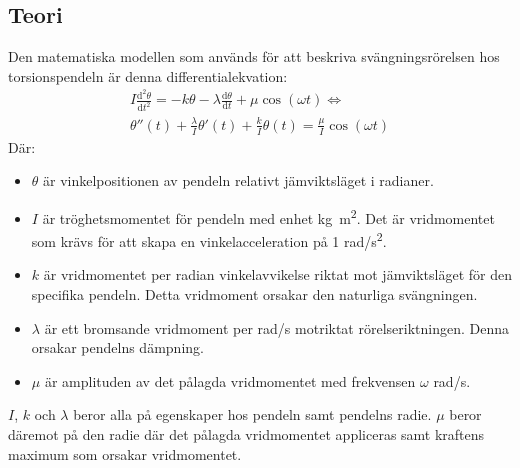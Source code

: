 \documentclass[12pt, a4paper]{article}
\begin{document}
\subsection{Teori}
Den matematiska modellen som används för att beskriva svängningsrörelsen hos torsionspendeln är denna differentialekvation:
\begin{equation*}
	\begin{split}
		I\frac{\mathrm{d}^2\theta}{\mathrm{d}t^2}=-k\theta-\lambda\frac{\mathrm{d}\theta}{\mathrm{d}t}+\mu\cos(\omega t)\Leftrightarrow\\
		\theta''(t)+\frac{\lambda}{I}\theta'(t)+\frac{k}{I}\theta(t)=\frac{\mu}{I}\cos(\omega t)
	\end{split}
\end{equation*}
Där: 
\begin{itemize}
	\item $\theta$ är vinkelpositionen av pendeln relativt jämviktsläget i radianer.
	\item $I$ är tröghetsmomentet för pendeln med enhet \si{kg.m^2}. Det är vridmomentet som krävs för att skapa en vinkelacceleration på 1 \si{rad/s^2}.
	\item $k$ är vridmomentet per radian vinkelavvikelse riktat mot jämviktsläget för den specifika pendeln. Detta vridmoment orsakar den naturliga svängningen.
	\item $\lambda$ är ett bromsande vridmoment per \si{rad/s} motriktat rörelseriktningen. Denna orsakar pendelns dämpning.
	\item $\mu$ är amplituden av det pålagda vridmomentet med frekvensen $\omega$ \si{rad/s}.
\end{itemize}
$I$, $k$ och $\lambda$ beror alla på egenskaper hos pendeln samt pendelns radie. $\mu$ beror däremot på den radie där det pålagda vridmomentet appliceras samt kraftens maximum som orsakar vridmomentet.
\end{document}
